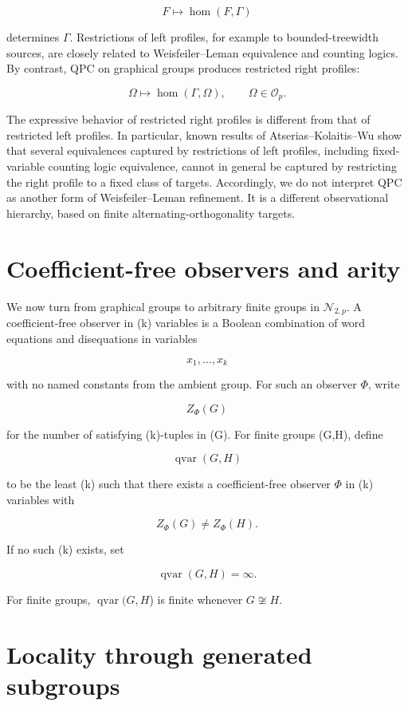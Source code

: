 \documentclass[11pt]{article}
\begin{document}
\[
F\mapsto \operatorname{hom}(F,\Gamma)
\]

determines $\Gamma$. Restrictions of left profiles, for example to bounded-treewidth sources, are closely related to Weisfeiler--Leman equivalence and counting logics. By contrast, QPC on graphical groups produces restricted right profiles:

\[
\Omega\mapsto \operatorname{hom}(\Gamma,\Omega),
\qquad
\Omega\in\mathcal O_p.
\]

The expressive behavior of restricted right profiles is different from that of restricted left profiles. In particular, known results of Atserias--Kolaitis--Wu show that several equivalences captured by restrictions of left profiles, including fixed-variable counting logic equivalence, cannot in general be captured by restricting the right profile to a fixed class of targets. Accordingly, we do not interpret QPC as another form of Weisfeiler--Leman refinement. It is a different observational hierarchy, based on finite alternating-orthogonality targets.

\section{Coefficient-free observers and arity}

We now turn from graphical groups to arbitrary finite groups in $\mathcal N_{2,p}$. A coefficient-free observer in (k) variables is a Boolean combination of word equations and disequations in variables

\[
x_1,\dots,x_k
\]

with no named constants from the ambient group. For such an observer $\Phi$, write

\[
Z_\Phi(G)
\]

for the number of satisfying (k)-tuples in (G). For finite groups (G,H), define

\[
\operatorname{qvar}(G,H)
\]

to be the least (k) such that there exists a coefficient-free observer $\Phi$ in (k) variables with

\[
Z_\Phi(G)\ne Z_\Phi(H).
\]

If no such (k) exists, set

\[
\operatorname{qvar}(G,H)=\infty.
\]

For finite groups, $\operatorname{qvar}(G,H$) is finite whenever $G\not\cong H$.

\section{Locality through generated subgroups}
\end{document}
